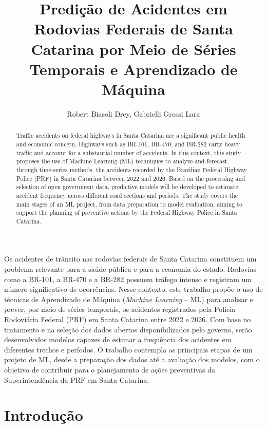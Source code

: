 \documentclass[12pt]{article}
\title{Predição de Acidentes em Rodovias Federais de Santa Catarina por Meio de Séries Temporais e Aprendizado de Máquina}
\author{Robert Biasoli Drey\inst{1}, Gabrielli Grossi Lara\inst{1}}
\begin{document}
 

\maketitle

\begin{abstract}
Traffic accidents on federal highways in Santa Catarina are a significant public health and economic concern. Highways such as BR-101, BR-470, and BR-282 carry heavy traffic and account for a substantial number of accidents. In this context, this study proposes the use of Machine Learning (ML) techniques to analyze and forecast, through time-series methods, the accidents recorded by the Brazilian Federal Highway Police (PRF) in Santa Catarina between 2022 and 2026. Based on the processing and selection of open government data, predictive models will be developed to estimate accident frequency across different road sections and periods. The study covers the main stages of an ML project, from data preparation to model evaluation, aiming to support the planning of preventive actions by the Federal Highway Police in Santa Catarina.

\end{abstract}
     
\begin{resumo} 
Os acidentes de trânsito nas rodovias federais de Santa Catarina constituem um problema relevante para a saúde pública e para a economia do estado. Rodovias como a BR-101, a BR-470 e a BR-282 possuem tráfego intenso e registram um número significativo de ocorrências. Nesse contexto, este trabalho propõe o uso de técnicas de Aprendizado de Máquina (\textit{Machine Learning} -- ML) para analisar e prever, por meio de séries temporais, os acidentes registrados pela Polícia Rodoviária Federal (PRF) em Santa Catarina entre 2022 e 2026. Com base no tratamento e na seleção dos dados abertos disponibilizados pelo governo, serão desenvolvidos modelos capazes de estimar a frequência dos acidentes em diferentes trechos e períodos. O trabalho contempla as principais etapas de um projeto de ML, desde a preparação dos dados até a avaliação dos modelos, com o objetivo de contribuir para o planejamento de ações preventivas da Superintendência da PRF em Santa Catarina.

\end{resumo}
\section{Introdução}
\end{document}
